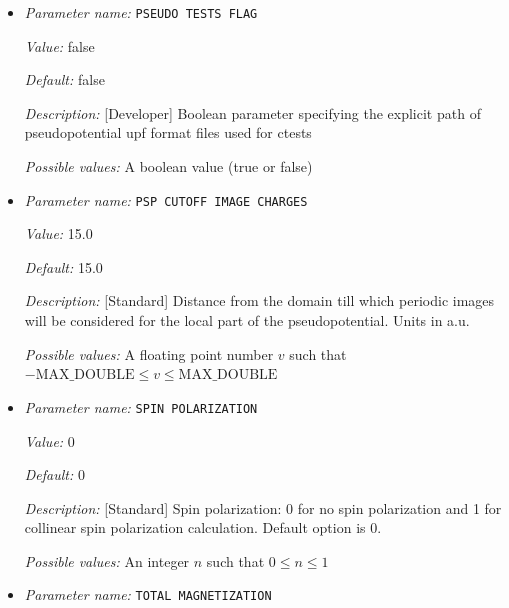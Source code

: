 \begin{itemize}
{\it Possible values:} Any string
\item {\it Parameter name:} {\tt PSEUDO TESTS FLAG}
\label{parameters:DFT functional parameters/PSEUDO TESTS FLAG}
\label{parameters:DFT_20functional_20parameters/PSEUDO_20TESTS_20FLAG}


{\it Value:} false


{\it Default:} false


{\it Description:} [Developer] Boolean parameter specifying the explicit path of pseudopotential upf format files used for ctests


{\it Possible values:} A boolean value (true or false)
\item {\it Parameter name:} {\tt PSP CUTOFF IMAGE CHARGES}
\label{parameters:DFT functional parameters/PSP CUTOFF IMAGE CHARGES}
\label{parameters:DFT_20functional_20parameters/PSP_20CUTOFF_20IMAGE_20CHARGES}


{\it Value:} 15.0


{\it Default:} 15.0


{\it Description:} [Standard] Distance from the domain till which periodic images will be considered for the local part of the pseudopotential. Units in a.u. 


{\it Possible values:} A floating point number $v$ such that $-\text{MAX\_DOUBLE} \leq v \leq \text{MAX\_DOUBLE}$
\item {\it Parameter name:} {\tt SPIN POLARIZATION}
\label{parameters:DFT functional parameters/SPIN POLARIZATION}
\label{parameters:DFT_20functional_20parameters/SPIN_20POLARIZATION}


{\it Value:} 0


{\it Default:} 0


{\it Description:} [Standard] Spin polarization: 0 for no spin polarization and 1 for collinear spin polarization calculation. Default option is 0.


{\it Possible values:} An integer $n$ such that $0\leq n \leq 1$
\item {\it Parameter name:} {\tt TOTAL MAGNETIZATION}
\label{parameters:DFT functional parameters/TOTAL MAGNETIZATION}
\label{parameters:DFT_20functional_20parameters/TOTAL_20MAGNETIZATION}



\end{itemize}
